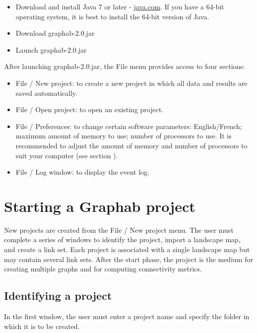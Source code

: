 \documentclass{article}
\begin{document}
\begin{itemize}
	\item Download and install Java 7 or later - \href{http://www.java.com}{java.com}. If you have a 64-bit operating system, it is best to install the 64-bit version of Java.
	\item Download graphab-2.0.jar
	\item Launch graphab-2.0.jar
\end{itemize}
After launching graphab-2.0.jar, the File menu provides access to four sections:
\begin{itemize}
	\item File / New project: to create a new project in which all data and results are saved automatically.  
	\item File / Open project: to open an existing project.
	\item File / Preferences: to change certain software parameters: English/French; maximum amount of memory to use; number of processors to use. It is recommended to adjust the amount of memory and number of processors to suit your computer (see section ).
	\item File / Log window: to display the event log.
\end{itemize}

\section{Starting a Graphab project }

New projects are created from the File / New project menu. The user must complete a series of windows to identify the project, import a landscape map, and create a link set. Each project is associated with a single landscape map but may contain several link sets. After the start phase, the project is the medium for creating multiple graphs and for computing connectivity metrics. 

\subsection{Identifying a project}

In the first window, the user must enter a project name and specify the folder in which it is to be created.
\end{document}
